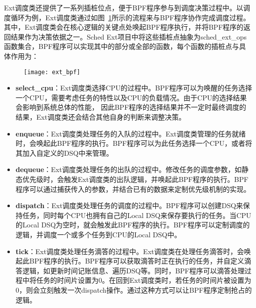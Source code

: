 Ext调度类还提供了一系列插桩位点，便于BPF程序参与到调度决策过程中。以调度循环为例，Ext调度类通过如图~\ref{fig:ext_bpf}所示的流程来与BPF程序协作完成调度过程。其中，Ext调度类会在核心逻辑的关键点处唤起BPF程序执行，并将BPF程序的返回结果作为决策依据之一。Sched Ext项目中将这些插桩点抽象为sched\_ext\_ops函数集合，BPF程序可以实现其中的部分或全部的函数，每个函数的插桩点与具体作用为：


\begin{figure}[!htbp]
    \centering
    \texttt{[image: ext\_bpf]}
    \label{fig:ext_bpf}
\end{figure}

\begin{itemize}

    \item \textbf{select\_cpu}：Ext调度类选择CPU的过程中。BPF程序可以为唤醒的任务选择一个CPU，需要考虑任务的特性以及CPU的负载情况。由于CPU的选择结果会影响到系统总体的性能，
    因此BPF程序的选择结果并不一定时最终调度的结果，Ext调度类还会结合其他自身的判断来调整决策。

    \item \textbf{enqueue}：Ext调度类处理任务的入队的过程中。Ext调度类管理的任务就绪时，会唤起此BPF程序的执行。BPF程序可以为此任务选择一个CPU，或者将其加入自定义的DSQ中来管理。

    \item \textbf{dequeue}：Ext调度类处理任务的出队的过程中。修改任务的调度参数，如静态优先级时，会触发Ext调度类的出队逻辑，并唤起此BPF程序的执行。BPF程序可以通过捕获传入的参数，并结合已有的数据来定制优先级机制的实现。
    
    \item \textbf{dispatch}：Ext调度类处理任务的调度的过程中。BPF程序可以创建DSQ来保持任务，同时每个CPU也拥有自己的Local DSQ来保存要执行的任务。当CPU的Local DSQ为空时，就会触发此BPF程序的执行。BPF程序可以定制调度的逻辑，并调度一个或多个任务到CPU的Local DSQ中。
    
    \item \textbf{tick}：Ext调度类处理任务滴答的过程中。Ext调度类在处理任务滴答时，会唤起此BPF程序的执行。BPF程序可以获取滴答时正在执行的任务，并自定义滴答逻辑，如更新时间记账信息、遍历DSQ等。同时，BPF程序可以滴答处理过程中将任务的时间片设置为0。在回到Ext调度类时，若任务的时间片被设置为0，则会立刻触发一次dispatch操作。通过这种方式可以让BPF程序定制抢占的逻辑。


\end{itemize}
